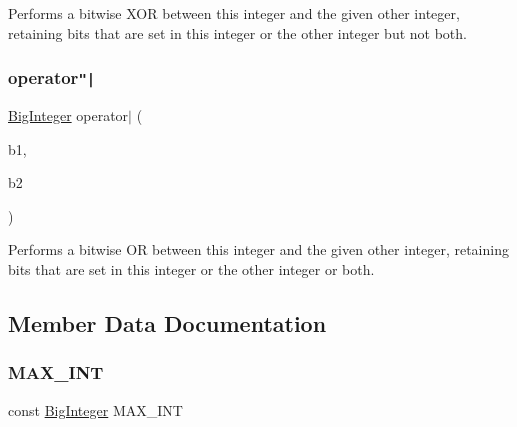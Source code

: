 Performs a bitwise X\+OR between this integer and the given other integer, retaining bits that are set in this integer or the other integer but not both. 

\mbox{\label{classBigInteger_ac175a35da208aba1aaddbfc60742f294}} 
\subsubsection{\texorpdfstring{operator\texttt{"|}}{operator|}}
{\footnotesize\ttfamily \mbox{\hyperlink{classBigInteger}{Big\+Integer}} operator$\vert$ (\begin{DoxyParamCaption}\item[{const \mbox{\hyperlink{classBigInteger}{Big\+Integer}} \&}]{b1,  }\item[{const \mbox{\hyperlink{classBigInteger}{Big\+Integer}} \&}]{b2 }\end{DoxyParamCaption})\hspace{0.3cm}{\ttfamily [friend]}}



Performs a bitwise OR between this integer and the given other integer, retaining bits that are set in this integer or the other integer or both. 



\subsection{Member Data Documentation}
\mbox{\label{classBigInteger_aabf0cd40063eb05e429aaa0da01ab591}} 
\subsubsection{\texorpdfstring{M\+A\+X\+\_\+\+I\+NT}{MAX\_INT}}
{\footnotesize\ttfamily const \mbox{\hyperlink{classBigInteger}{Big\+Integer}} M\+A\+X\+\_\+\+I\+NT\hspace{0.3cm}{\ttfamily [static]}}

\mbox{\label{classBigInteger_a95806eb2e6c271c43e2a9db1f4f3997c}} 
